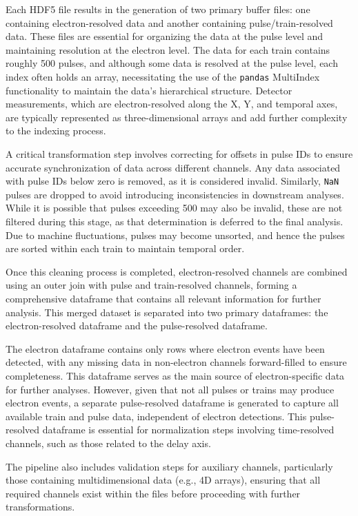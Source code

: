 Each HDF5 file results in the generation of two primary buffer files: one containing electron-resolved data and another containing pulse/train-resolved data. These files are essential for organizing the data at the pulse level and maintaining resolution at the electron level. The data for each train contains roughly 500 pulses, and although some data is resolved at the pulse level, each index often holds an array, necessitating the use of the \texttt{pandas} MultiIndex functionality to maintain the data’s hierarchical structure. Detector measurements, which are electron-resolved along the X, Y, and temporal axes, are typically represented as three-dimensional arrays and add further complexity to the indexing process.

A critical transformation step involves correcting for offsets in pulse IDs to ensure accurate synchronization of data across different channels. Any data associated with pulse IDs below zero is removed, as it is considered invalid. Similarly, \texttt{NaN} pulses are dropped to avoid introducing inconsistencies in downstream analyses. While it is possible that pulses exceeding 500 may also be invalid, these are not filtered during this stage, as that determination is deferred to the final analysis. Due to machine fluctuations, pulses may become unsorted, and hence the pulses are sorted within each train to maintain temporal order.

Once this cleaning process is completed, electron-resolved channels are combined using an outer join with pulse and train-resolved channels, forming a comprehensive dataframe that contains all relevant information for further analysis. This merged dataset is separated into two primary dataframes: the electron-resolved dataframe and the pulse-resolved dataframe.

The electron dataframe contains only rows where electron events have been detected, with any missing data in non-electron channels forward-filled to ensure completeness. This dataframe serves as the main source of electron-specific data for further analyses. However, given that not all pulses or trains may produce electron events, a separate pulse-resolved dataframe is generated to capture all available train and pulse data, independent of electron detections. This pulse-resolved dataframe is essential for normalization steps involving time-resolved channels, such as those related to the delay axis.

The pipeline also includes validation steps for auxiliary channels, particularly those containing multidimensional data (e.g., 4D arrays), ensuring that all required channels exist within the files before proceeding with further transformations.

